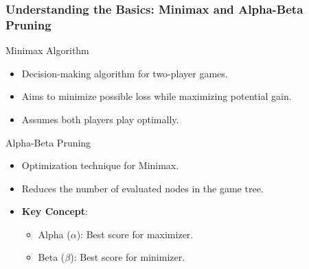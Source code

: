 \documentclass[aspectratio=169]{beamer}
\begin{document}
\begin{frame}[fragile]
    \frametitle{Understanding the Basics: Minimax and Alpha-Beta Pruning}
    \begin{block}{Minimax Algorithm}
        \begin{itemize}
            \item Decision-making algorithm for two-player games.
            \item Aims to minimize possible loss while maximizing potential gain.
            \item Assumes both players play optimally.
        \end{itemize}
    \end{block}
    
    \begin{block}{Alpha-Beta Pruning}
        \begin{itemize}
            \item Optimization technique for Minimax.
            \item Reduces the number of evaluated nodes in the game tree.
            \item \textbf{Key Concept}:
            \begin{itemize}
                \item Alpha ($\alpha$): Best score for maximizer.
                \item Beta ($\beta$): Best score for minimizer.
            \end{itemize}
        \end{itemize}
    \end{block}
\end{frame}
\end{document}
